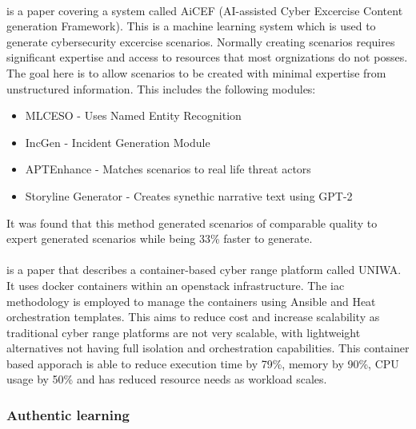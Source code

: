 \paragraph{}\cite{zacharis_aicef_2023} is a paper covering a system called AiCEF (AI-assisted Cyber Excercise Content generation Framework). This is a machine learning system which is used to generate cybersecurity excercise scenarios. Normally creating scenarios requires significant expertise and access to resources that most orgnizations do not posses. The goal here is to allow scenarios to be created with minimal expertise from unstructured information. This includes the following modules:
\begin{itemize}
    \item MLCESO - Uses Named Entity Recognition
    \item IncGen - Incident Generation Module
    \item APTEnhance - Matches scenarios to real life threat actors
    \item Storyline Generator - Creates synethic narrative text using GPT-2
\end{itemize}
It was found that this method generated scenarios of comparable quality to expert generated scenarios while being 33\% faster to generate.

\paragraph{}\autocite{chouliaras_novel_2023} is a paper that describes a container-based cyber range platform called UNIWA. It uses docker containers within an openstack infrastructure. The \acrfull{iac} methodology is employed to manage the containers using Ansible and Heat orchestration templates. This aims to reduce cost and increase scalability as traditional cyber range platforms are not very scalable, with lightweight alternatives not having full isolation and orchestration capabilities. This container based apporach is able to reduce execution time by 79\%, memory by 90\%, CPU usage by 50\% and has reduced resource needs as workload scales.

\subsubsection{Authentic learning}

